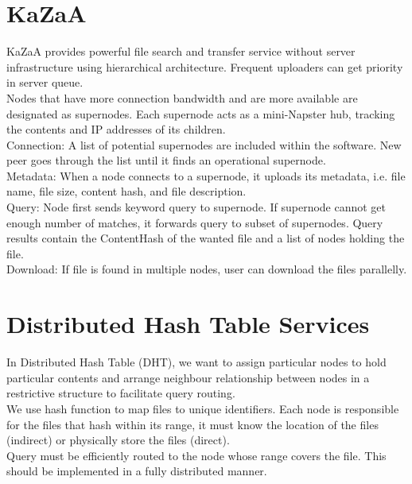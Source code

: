 \begin{multicols*}{2}
\section{KaZaA}

\noindent KaZaA provides powerful file search and transfer service without server infrastructure using hierarchical architecture. Frequent uploaders can get priority in server queue. \\

\noindent Nodes that have more connection bandwidth and are more available are designated as supernodes. Each supernode acts as a mini-Napster hub, tracking the contents and IP addresses of its children. \\

\noindent Connection: A list of potential supernodes are included within the software. New peer goes through the list until it finds an operational supernode.\\

\noindent Metadata: When a node connects to a supernode, it uploads its metadata, i.e. file name, file size, content hash, and file description.\\

\noindent Query: Node first sends keyword query to supernode. If supernode cannot get enough number of matches, it forwards query to subset of supernodes. Query results contain the ContentHash of the wanted file and a list of nodes holding the file.\\

\noindent Download: If file is found in multiple nodes, user can download the files parallelly.

\section{Distributed Hash Table Services}

\noindent In Distributed Hash Table (DHT), we want to assign particular nodes to hold particular contents and arrange neighbour relationship between nodes in a restrictive structure to facilitate query routing.\\

\noindent We use hash function to map files to unique identifiers. Each node is responsible for the files that hash within its range, it must know the location of the files (indirect) or physically store the files (direct). \\

\noindent Query must be efficiently routed to the node whose range covers the file. This should be implemented in a fully distributed manner. \\


\end{multicols*}
